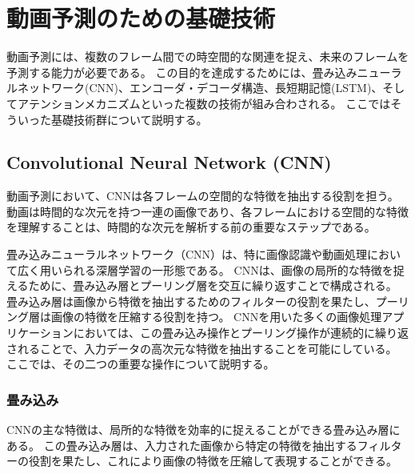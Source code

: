   \section{動画予測のための基礎技術}
    動画予測には、複数のフレーム間での時空間的な関連を捉え、未来のフレームを予測する能力が必要である。
    この目的を達成するためには、畳み込みニューラルネットワーク(CNN)、エンコーダ・デコーダ構造、長短期記憶(LSTM)、そしてアテンションメカニズムといった複数の技術が組み合わされる。
    ここではそういった基礎技術群について説明する。

    \subsection{Convolutional Neural Network (CNN)}
      動画予測において、CNNは各フレームの空間的な特徴を抽出する役割を担う。
      動画は時間的な次元を持つ一連の画像であり、各フレームにおける空間的な特徴を理解することは、時間的な次元を解析する前の重要なステップである。

      畳み込みニューラルネットワーク（CNN）は、特に画像認識や動画処理において広く用いられる深層学習の一形態である。
      CNNは、画像の局所的な特徴を捉えるために、畳み込み層とプーリング層を交互に繰り返すことで構成される。
      畳み込み層は画像から特徴を抽出するためのフィルターの役割を果たし、プーリング層は画像の特徴を圧縮する役割を持つ。
      CNNを用いた多くの画像処理アプリケーションにおいては、この畳み込み操作とプーリング操作が連続的に繰り返されることで、入力データの高次元な特徴を抽出することを可能にしている。
      ここでは、その二つの重要な操作について説明する。
    
      \subsubsection{畳み込み}
        CNNの主な特徴は、局所的な特徴を効率的に捉えることができる畳み込み層にある。
        この畳み込み層は、入力された画像から特定の特徴を抽出するフィルターの役割を果たし、これにより画像の特徴を圧縮して表現することができる。
        
